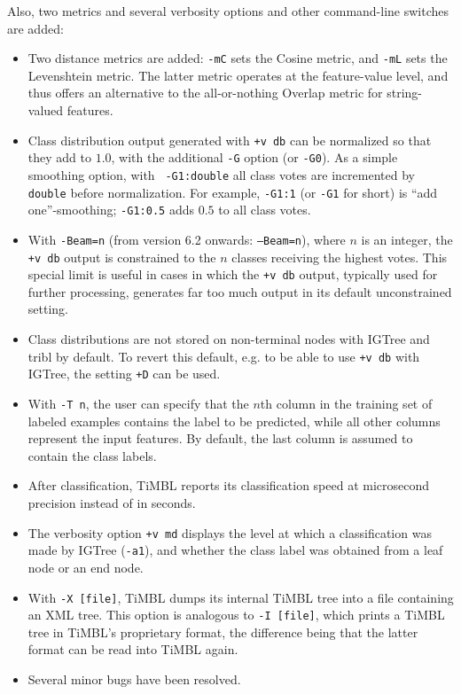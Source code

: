 \documentclass{report}
\begin{document}
Also, two metrics and several verbosity options and other command-line
switches are added:

\begin{itemize}

\item Two distance metrics are added: {\tt -mC} sets the Cosine
  metric, and {\tt -mL} sets the Levenshtein metric. The latter metric
  operates at the feature-value level, and thus offers an alternative
  to the all-or-nothing Overlap metric for string-valued features. 

\item Class distribution output generated with {\tt +v db} can be
  normalized so that they add to $1.0$, with the additional {\tt -G}
  option (or {\tt -G0}). As a simple smoothing option, with {\tt
    -G1:double} all class votes are incremented by {\tt double} before
  normalization.  For example, {\tt -G1:1} (or {\tt -G1} for short) is
  ``add one''-smoothing; {\tt -G1:0.5} adds $0.5$ to all class votes.

\item With {\tt -Beam=n} (from version 6.2 onwards: {\tt --Beam=n}), where $n$ is an integer, the {\tt +v db}
  output is constrained to the $n$ classes receiving the highest
  votes. This special limit is useful in cases in which the {\tt +v
    db} output, typically used for further processing, generates far
  too much output in its default unconstrained setting. 

\item Class distributions are not stored on non-terminal nodes with
  {\sc IGTree} and {\sc tribl} by default. To revert this default,
  e.g. to be able to use {\tt +v db} with {\sc IGTree}, the setting
  {\tt +D} can be used.

\item With {\tt -T n}, the user can specify that the $n$th column in
  the training set of labeled examples contains the label to be
  predicted, while all other columns represent the input features. By
  default, the last column is assumed to contain the class labels.

\item After classification, TiMBL reports its classification speed at
  microsecond precision instead of in seconds.

\item The verbosity option {\tt +v md} displays the level at which a
  classification was made by {\sc IGTree} ({\tt -a1}), and whether the
  class label was obtained from a leaf node or an end node.

\item With {\tt -X [file]}, TiMBL dumps its internal TiMBL tree into a
  file containing an XML tree. This option is analogous to {\tt -I
    [file]}, which prints a TiMBL tree in TiMBL's proprietary format,
  the difference being that the latter format can be read into TiMBL
  again.

\item Several minor bugs have been resolved.

\end{itemize}
\end{document}
